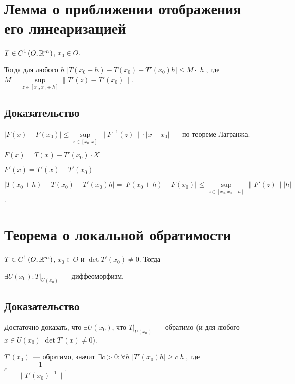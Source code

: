 \documentclass{article}
\begin{document}
    \newpage
    
    \section{Лемма о приближении отображения его линеаризацией}
    
        $T \in C^1 \left( O, \mathbb{R}^m \right)$, $x_0 \in O$.
        
        Тогда для любого $h$ $\left| T(x_0 + h) - T(x_0) - T'(x_0) h \right| \leq M \cdot |h|$, где $M = \sup\limits_{z \in [x_0, x_0 + h]} \| T'(z) - T'(x_0) \|$.
        
        \subsection{Доказательство}
        
            $\left| F(x) - F(x_0) \right| \leq \sup\limits_{z \in [x_0, x]} \| F^{-1} (z) \| \cdot | x - x_0 |$~--- по теореме Лагранжа.
            
            $F(x) = T(x) - T'(x_0) \cdot X$
            
            $F'(x) = T'(x) - T'(x_0)$
            
            $\left| T(x_0 + h) - T(x_0) - T'(x_0) h \right| = \left| F(x_0 + h) - F(x_0) \right| \leq \sup\limits_{z \in [x_0, x_0 + h]} \| F'(z) \| |h|$.
            
    \newpage
    
    \section{Теорема о локальной обратимости}
    
        $T \in C^1 \left( O, \mathbb{R}^m \right)$, $x_0 \in O$ и $\det T'(x_0) \neq 0$. Тогда
        
        $\exists U(x_0) : T \big|_{U(x_0)}$~--- диффеоморфизм.
        
        \subsection{Доказательство}
        
            Достаточно доказать, что $\exists U(x_0)$, что $T \big|_{U(x_0)}$~--- обратимо (и для любого $x \in U(x_0)$ $\det T'(x) \neq 0$).
            
            $T'(x_0)$~--- обратимо, значит $\exists c > 0 : \forall h$ $\left| T'(x_0) h \right| \geq c |h|$, где $c = \dfrac{1}{\| T'(x_0)^{-1} \|}$.
            
\end{document}
